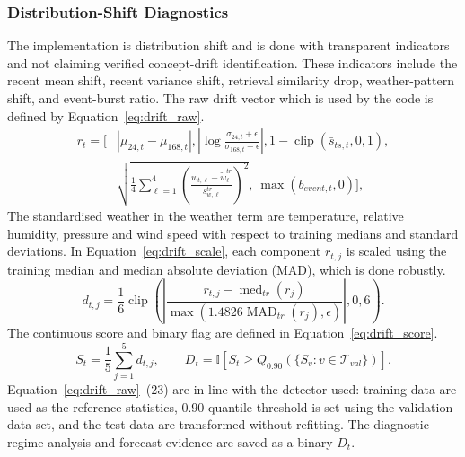 \documentclass{ieeeaccess}
\begin{document}
\subsubsection{Distribution-Shift Diagnostics}
The implementation is distribution shift and is done with transparent indicators and not claiming verified concept-drift identification. These indicators include the recent mean shift, recent variance shift, retrieval similarity drop, weather-pattern shift, and event-burst ratio. The raw drift vector which is used by the code is defined by Equation~\eqref{eq:drift_raw}.
\begin{equation}
\begin{aligned}
r_t=\bigg[&|\mu_{24,t}-\mu_{168,t}|,
\left|\log\frac{\sigma_{24,t}+\epsilon}{\sigma_{168,t}+\epsilon}\right|,
1-\operatorname{clip}(\bar{s}_{ts,t},0,1),\\
&\sqrt{\frac{1}{4}\sum_{\ell=1}^{4}
\left(\frac{w_{t,\ell}-\widetilde{w}^{tr}_{\ell}}
{s^{tr}_{w,\ell}}\right)^2},\ \max(b_{event,t},0)\bigg],
\end{aligned}
\label{eq:drift_raw}
\end{equation}
The standardised weather in the weather term are temperature, relative humidity, pressure and wind speed with respect to training medians and standard deviations. In Equation~\eqref{eq:drift_scale}, each component $r_{t, j}$ is scaled using the training median and median absolute deviation (MAD), which is done robustly.
\begin{equation}
d_{t,j}=\frac{1}{6}\operatorname{clip}\left(
\left|\frac{r_{t,j}-\operatorname{med}_{tr}(r_j)}
{\max(1.4826\operatorname{MAD}_{tr}(r_j),\epsilon)}\right|,0,6\right).
\label{eq:drift_scale}
\end{equation}
The continuous score and binary flag are defined in Equation~\eqref{eq:drift_score}.
\begin{equation}
S_t=\frac{1}{5}\sum_{j=1}^{5}d_{t,j},\qquad
D_t=\mathbb{I}\!\left[S_t\geq
Q_{0.90}\!\left(\{S_v:v\in\mathcal{T}_{val}\}\right)\right].
\label{eq:drift_score}
\end{equation}
Equation~\eqref{eq:drift_raw}--(23) are in line with the detector used: training data are used as the reference statistics, 0.90-quantile threshold is set using the validation data set, and the test data are transformed without refitting. The diagnostic regime analysis and forecast evidence are saved as a binary $D_{t}$.
\end{document}
